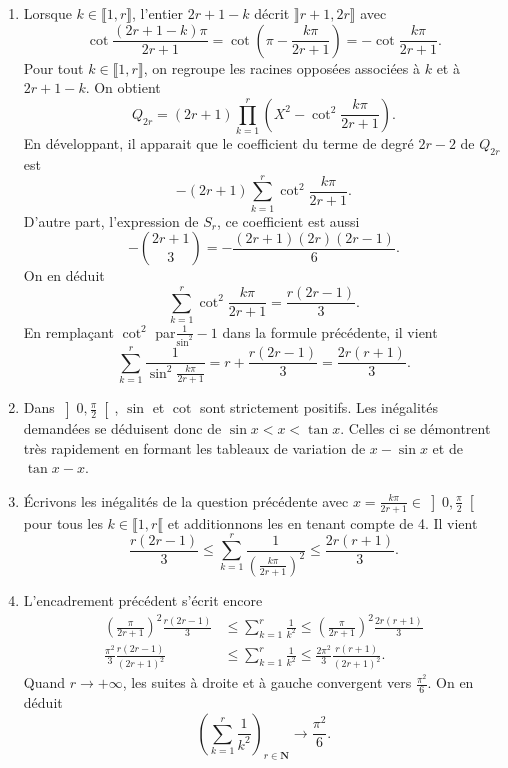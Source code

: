 \begin{enumerate}
\item  Lorsque $k\in \llbracket 1,r\rrbracket$, l'entier $2r+1-k$
d{\'e}crit $\rrbracket r+1,2r\rrbracket$ avec
\[
\cot \frac{(2r+1-k)\pi }{2r+1}=\cot (\pi -\frac{k\pi }{2r+1})=-\cot \frac{k\pi }{2r+1}.
\]
Pour tout $k\in\llbracket 1 ,r\rrbracket$, on regroupe les racines opposées associ{\'e}es {\`a} $k$ et {\`a} $2r+1-k$. On obtient
\[
Q_{2r}=(2r+1)\prod_{k=1}^{r}\left( X^{2}-\cot ^{2}\frac{k\pi }{2r+1}\right).
\]
En d{\'e}veloppant, il apparait que le coefficient du terme de degr{\'e} $2r-2$ de $Q_{2r}$ est
\[
-(2r+1)\sum_{k=1}^{r}\cot ^{2}\frac{k\pi }{2r+1}.
\]
D'autre part, l'expression de $S_r$, ce coefficient est aussi
\[
-\binom{2r+1}{3}=-\frac{(2r+1)(2r)(2r-1)}{6}.
\]
On en d{\'e}duit
\[
\sum_{k=1}^{r}\cot ^{2}\frac{k\pi }{2r+1}=\frac{r(2r-1)}{3}.
\]
En rempla\c{c}ant $\cot ^{2}$ par$\frac{1}{\sin ^{2}}-1$ dans la formule pr{\'e}c{\'e}dente, il vient
\[
\sum_{k=1}^{r}\frac{1}{\sin ^{2}\frac{k\pi }{2r+1}} = r + \frac{r(2r-1)}{3}
= \frac{2r(r+1)}{3}.
\]

\item  Dans $\left] 0,\frac{\pi }{2}\right[ $, $\sin $ et $\cot $ sont strictement positifs. Les in{\'e}galit{\'e}s demand{\'e}es se déduisent donc de $\sin x<x<\tan x$. Celles ci se d{\'e}montrent tr{\`e}s rapidement en formant les tableaux de variation de $x-\sin x$ et de
$\tan x-x$.

\item  \'Ecrivons les inégalités de la question précédente avec $x=\frac{k\pi }{2r+1} \in \left] 0,\frac{\pi }{2}\right[$ pour tous les $k\in \llbracket 1,r\llbracket$  et additionnons les en tenant compte de 4. Il vient
\[
\frac{r(2r-1)}{3}
\leq \sum_{k=1}^{r}\frac{1}{\left( \frac{k\pi }{2r+1}\right) ^{2}}
\leq \frac{2r(r+1)}{3}.
\]

\item  L'encadrement pr{\'e}c{\'e}dent s'{\'e}crit encore
\begin{align*}
\left( \frac{\pi }{2r+1}\right) ^{2}\frac{r(2r-1)}{3} 
&\leq 
\sum_{k=1}^{r}\frac{1}{k^{2}}\leq \left( \frac{\pi }{2r+1}\right) ^{2}\frac{2r(r+1)}{3} \\
\frac{\pi^{2}}{3}\frac{r(2r-1)}{(2r+1)^{2}} 
&\leq 
\sum_{k=1}^{r}\frac{1}{k^{2}}\leq \frac{2\pi ^{2}}{3}\frac{r(r+1)}{(2r+1)^{2}}.
\end{align*}
Quand $r\rightarrow +\infty $, les suites {\`a} droite et {\`a} gauche convergent vers $\frac{\pi ^{2}}{6}$. On en d{\'e}duit
\[
(\sum_{k=1}^{r}\frac{1}{k^{2}})_{r\in \mathbf{N}}\rightarrow \frac{\pi ^{2}}{6}.
\]
\end{enumerate}
